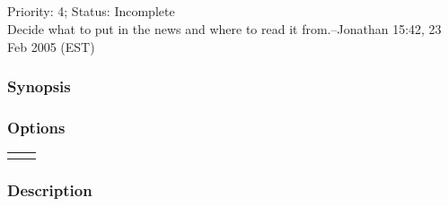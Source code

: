 \subsection{}
\label{soarnews}
 Priority: 4; Status: Incomplete\\ 
Decide what to put in the news and where to read it from.--Jonathan 15:42, 23 Feb 2005 (EST) 
\subsubsection*{Synopsis}
\subsubsection*{Options}
\begin{tabular}{|l|l|}
\hline 
 & \\
 \hline 
 & \\
 \hline 
\end{tabular}
\subsubsection*{Description}
